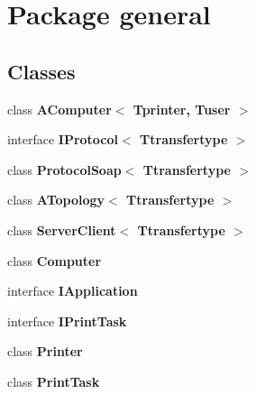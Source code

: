 \section{Package general}
\label{namespacegeneral}
\subsection*{Classes}
\begin{DoxyCompactItemize}
\item 
class {\bf A\-Computer$<$ Tprinter, Tuser $>$}
\item 
interface {\bf I\-Protocol$<$ Ttransfertype $>$}
\item 
class {\bf Protocol\-Soap$<$ Ttransfertype $>$}
\item 
class {\bf A\-Topology$<$ Ttransfertype $>$}
\item 
class {\bf Server\-Client$<$ Ttransfertype $>$}
\item 
class {\bf Computer}
\item 
interface {\bf I\-Application}
\item 
interface {\bf I\-Print\-Task}
\item 
class {\bf Printer}
\item 
class {\bf Print\-Task}
\end{DoxyCompactItemize}

